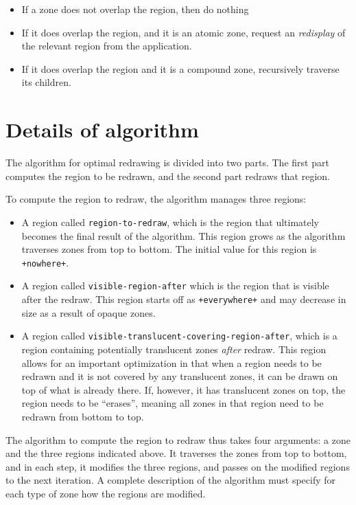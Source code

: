 \documentclass{report}
\begin{document}
\begin{itemize}
\item If a zone does not overlap the region, then do nothing
\item If it does overlap the region, and it is an atomic zone,
  request an \emph{redisplay} of the relevant region from the
  application. 
\item If it does overlap the region and it is a compound zone,
  recursively traverse its children.
\end{itemize}

\section{Details of algorithm}

The algorithm for optimal redrawing is divided into two parts.  The
first part computes the region to be redrawn, and the second part
redraws that region.

To compute the region to redraw, the algorithm manages three regions:

\begin{itemize}
\item A region called \texttt{region-to-redraw}, which is the region
  that ultimately becomes the final result of the algorithm.  This
  region grows as the algorithm traverses zones from top to bottom.
  The initial value for this region is \texttt{+nowhere+}.
\item A region called \texttt{visible-region-after} which is the
  region that is visible after the redraw.  This region starts off as
  \texttt{+everywhere+} and may decrease in size as a result of opaque
  zones.
\item A region called
  \texttt{visible-translucent-covering-region-after}, which is a
  region containing potentially translucent zones \emph{after}
  redraw.  This region allows for an important optimization in that
  when a region needs to be redrawn and it is not covered by any
  translucent zones, it can be drawn on top of what is already
  there.  If, however, it has translucent zones on top, the region
  needs to be ``erases'', meaning all zones in that region need to
  be redrawn from bottom to top. 
\end{itemize}

The algorithm to compute the region to redraw thus takes four
arguments: a zone and the three regions indicated above.  It
traverses the zones from top to bottom, and in each step, it
modifies the three regions, and passes on the modified regions to the
next iteration.  A complete description of the algorithm must specify
for each type of zone how the regions are modified. 
\end{document}
